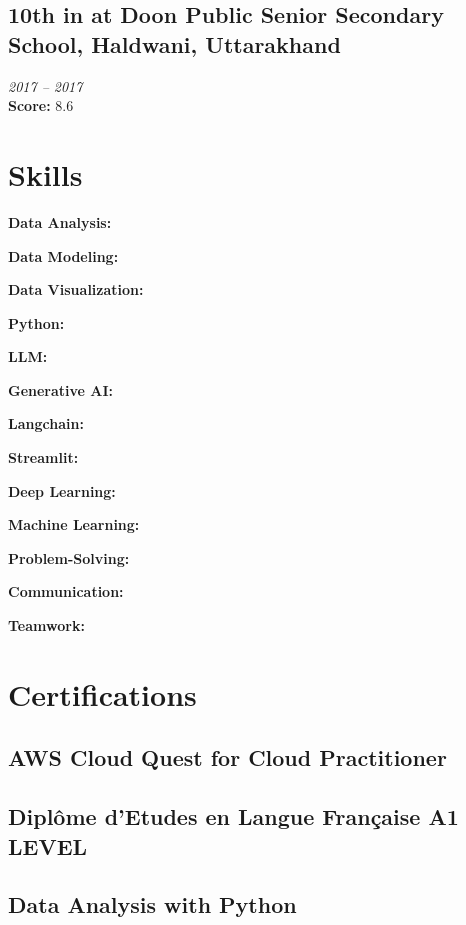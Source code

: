 \documentclass{article}
\begin{document}
\subsection{10th in  at Doon Public Senior Secondary School, Haldwani, Uttarakhand}
\textit{2017 -- 2017}\\
\textbf{Score:} 8.6\\

\section{Skills}
\textbf{Data Analysis:} 

\textbf{Data Modeling:} 

\textbf{Data Visualization:} 

\textbf{Python:} 

\textbf{LLM:} 

\textbf{Generative AI:} 

\textbf{Langchain:} 

\textbf{Streamlit:} 

\textbf{Deep Learning:} 

\textbf{Machine Learning:} 

\textbf{Problem-Solving:} 

\textbf{Communication:} 

\textbf{Teamwork:} 

\section{Certifications}
\subsection{AWS Cloud Quest for Cloud Practitioner}

\subsection{Diplôme d'Etudes en Langue Française A1 LEVEL}

\subsection{Data Analysis with Python}
\end{document}
